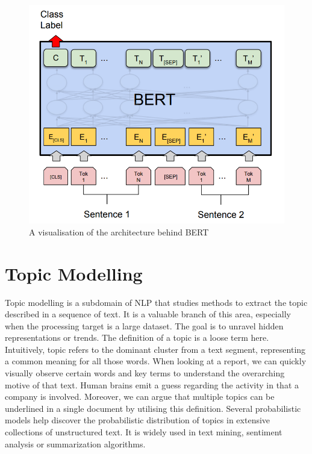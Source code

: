 \documentclass[12pt,MSc,a4paper,oneside]{muthesis}
\begin{document}
\begin{figure}[h]
  \centering
  \includegraphics[scale=0.5]{images/abstract/bert.png}
  \caption{A visualisation of the architecture behind BERT}
\end{figure}

\section{Topic Modelling}
Topic modelling is a subdomain of NLP that studies methods to extract the topic described in a sequence of text. It is a valuable branch of this area, especially when the processing target is a large dataset. The goal is to unravel hidden representations or trends. The definition of a topic is a loose term here. Intuitively, topic refers to the dominant cluster from a text segment, representing a common meaning for all those words. When looking at a report, we can quickly visually observe certain words and key terms to understand the overarching motive of that text. Human brains emit a guess regarding the activity in that a company is involved.
Moreover, we can argue that multiple topics can be underlined in a single document by utilising this definition. Several probabilistic models help discover the probabilistic distribution of topics in extensive collections of unstructured text. It is widely used in text mining, sentiment analysis or summarization algorithms.
\end{document}
